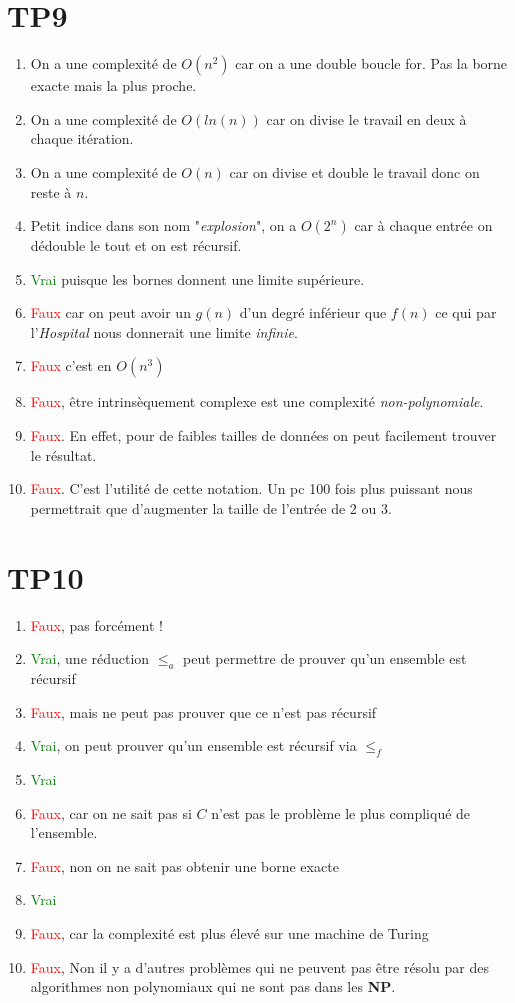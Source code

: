 \documentclass{report}
\begin{document}
\section{TP9}
\begin{enumerate}
\item On a une complexité de $O(n^2)$ car on a une double boucle for. Pas la borne exacte mais la plus proche.
\item On a une complexité de $O(ln(n))$ car on divise le travail en deux à chaque itération.
\item On a une complexité de $O(n)$ car on divise et double le travail donc on reste à $n$.
\item Petit indice dans son nom "\textit{explosion}", on a $O(2^n)$ car à chaque entrée on dédouble le tout et on est récursif.
\item \textcolor{green}{Vrai} puisque les bornes donnent une limite supérieure.
\item \textcolor{red}{Faux} car on peut avoir un $g(n)$ d'un degré inférieur que $f(n)$ ce qui par l'\textit{Hospital} nous donnerait une limite \textit{infinie}.
\item \textcolor{red}{Faux} c'est en $O(n^3)$
\item \textcolor{red}{Faux}, être intrinsèquement complexe est une complexité \textit{non-polynomiale}.
\item \textcolor{red}{Faux}. En effet, pour de faibles tailles de données on peut facilement trouver le résultat.
\item \textcolor{red}{Faux}. C'est l'utilité de cette notation. Un pc 100 fois plus puissant nous permettrait que d'augmenter la taille de l'entrée de $2$ ou $3$.
\end{enumerate}

\section{TP10}
\begin{enumerate}
\item \textcolor{red}{Faux}, pas forcément !
\item \textcolor{green}{Vrai}, une réduction $\leqslant_a$ peut permettre de prouver qu'un ensemble est récursif
\item \textcolor{red}{Faux}, mais ne peut pas prouver que ce n'est pas récursif
\item \textcolor{green}{Vrai}, on peut prouver qu'un ensemble est récursif via $\leqslant_f$
\item \textcolor{green}{Vrai}
\item \textcolor{red}{Faux}, car on ne sait pas si $C$ n'est pas le problème le plus compliqué de l'ensemble.
\item \textcolor{red}{Faux}, non on ne sait pas obtenir une borne exacte
\item \textcolor{green}{Vrai}
\item \textcolor{red}{Faux}, car la complexité est plus élevé sur une machine de Turing
\item \textcolor{red}{Faux}, Non il y a d'autres problèmes qui ne peuvent pas être résolu par des algorithmes non polynomiaux qui ne sont pas dans les \textbf{NP}.
\end{enumerate}
\end{document}

